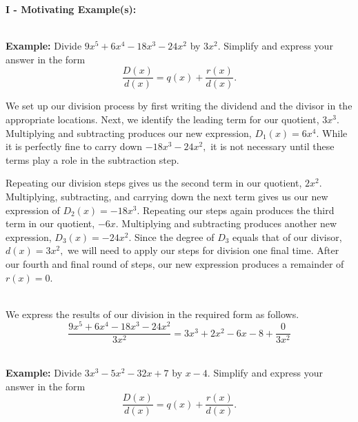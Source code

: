 \documentclass[12pt]{article}
\theoremstyle{definition}
\begin{document}
{\bf I - Motivating Example(s):}\\
\ \par
{\bf Example:} Divide $9x^5+6x^4-18x^3-24x^2$ by $3x^2$.  Simplify and express your answer in the form
$$\frac{D(x)}{d(x)}=q(x)+\dfrac{r(x)}{d(x)}.$$
\begin{multicols}{2}


\columnbreak
We set up our division process by first writing the dividend and the divisor in the appropriate locations. Next, we identify the leading term for our quotient, $3x^3$. Multiplying and subtracting produces our new expression, $D_1(x)=6x^4$. While it is perfectly fine to carry down $-18x^3-24x^2,$ it is not necessary until these terms play a role in the subtraction step.
\end{multicols}
  Repeating our division steps gives us the second term in our quotient, $2x^2$.  Multiplying, subtracting, and carrying down the next term gives us our new expression of $D_2(x)=-18x^3$. Repeating our steps again produces the third term in our quotient, $-6x$. Multiplying and subtracting produces another new expression, $D_3(x)=-24x^2$.  Since the degree of $D_3$ equals that of our divisor, $d(x)=3x^2,$ we will need to apply our steps for division one final time.  After our fourth and final round of steps, our new expression produces a remainder of $r(x)=0$.\\
\ \par
We express the results of our division in the required form as follows.
$$\dfrac{9x^5+6x^4-18x^3-24x^2}{3x^2}=3x^3+2x^2-6x-8+\dfrac{0}{3x^2}$$
\ \par
{\bf Example:} Divide $3x^3-5x^2-32x+7$ by $x-4$.  Simplify and express your answer in the form
$$\frac{D(x)}{d(x)}=q(x)+\dfrac{r(x)}{d(x)}.$$
\end{document}
